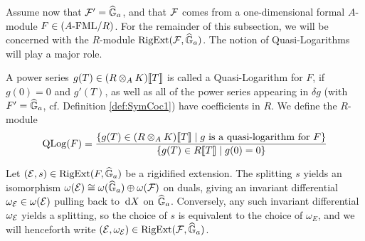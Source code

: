 \documentclass[../main.tex]{subfiles}
\begin{document}
Assume now that $\mathcal{F}' = \widehat{\mathbb{G}}_a$, and that 
$\mathcal{F}$ comes from a one-dimensional formal $A$-module $F \in {({A}\text-\allowbreak\mathrm{FML}/{R})}$. For
the remainder of this subsection, we will be concerned with the $R$-module
$\operatorname {RigExt}(\mathcal{F}, \widehat{\mathbb{G}}_a)$. The notion of Quasi-Logarithms will play a major role.

\begin{defi}\label{def:QuasiLogarithm}
  A power series $g(T) \in (R \otimes_A K) \llbracket T \rrbracket$ is called a 
  Quasi-Logarithm for $F$, if $g(0) = 0$ and $g'(T)$, as well as all 
  of the power series appearing in $\delta g$ (with $F' = \widehat{\mathbb{G}}_a$, cf.
  Definition \ref{def:SymCoc1})
  have coefficients in $R$. We define the $R$-module
  \begin{equation*}
    \operatorname {QLog}(F) = \frac{\{g(T) \in (R \otimes_A K) \llbracket T \rrbracket \mid g \text{ is a 
    quasi-logarithm for } F\}}{\{g(T) \in R\llbracket T \rrbracket \mid g(0) = 0\}}
  \end{equation*}
\end{defi}

Let $(\mathcal{E},s) \in \operatorname {RigExt}(F,\widehat{\mathbb{G}}_a)$ be a rigidified extension. 
The splitting $s$ yields an isomorphism $\omega(\mathcal{E}) \cong \omega(\widehat{\mathbb{G}}_a) \oplus
\omega(\mathcal{F})$ on duals, giving an invariant differential $\omega_{\mathcal{E}} \in
\omega(\mathcal{E})$ pulling back to $\, \mathrm{d} X$ on $\widehat{\mathbb{G}}_a$. Conversely, any such invariant
differential $\omega_{\mathcal{E}}$ yields a splitting, so the choice of $s$ is
equivalent to the choice of $\omega_E$, and we will henceforth write 
$(\mathcal{E}, \omega_{\mathcal{E}}) \in \operatorname {RigExt}(\mathcal{F}, \widehat{\mathbb{G}}_a)$. 
\end{document}
